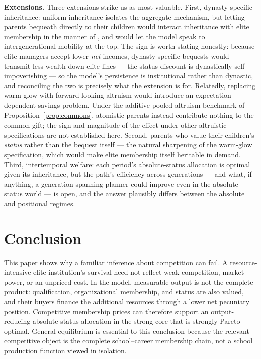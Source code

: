 \documentclass[12pt,letterpaper]{article}
\theoremstyle{definition}
\begin{document}
\textbf{Extensions.}
Three extensions strike us as most valuable.
First, dynasty-specific inheritance: uniform inheritance isolates the aggregate mechanism, but letting parents bequeath directly to their children would interact inheritance with elite membership in the manner of \citet{galorzeira1993}, and would let the model speak to intergenerational mobility at the top.
The sign is worth stating honestly: because elite managers accept lower \emph{net} incomes, dynasty-specific bequests would transmit less wealth down elite lines --- the status discount is dynastically self-impoverishing --- so the model's persistence is institutional rather than dynastic, and reconciling the two is precisely what the extension is for.
Relatedly, replacing warm glow with forward-looking altruism would introduce an expectation-dependent savings problem.
Under the additive pooled-altruism benchmark of Proposition~\ref{prop:commons}, atomistic parents instead contribute nothing to the common gift; the sign and magnitude of the effect under other altruistic specifications are not established here.
Second, parents who value their children's \emph{status} rather than the bequest itself --- the natural sharpening of the warm-glow specification, which would make elite membership itself heritable in demand.
Third, intertemporal welfare: each period's absolute-status allocation is optimal given its inheritance, but the path's efficiency across generations --- and what, if anything, a generation-spanning planner could improve even in the absolute-status world --- is open, and the answer plausibly differs between the absolute and positional regimes.

\section{Conclusion}\label{sec:conclusion}

This paper shows why a familiar inference about competition can fail.
A resource-intensive elite institution's survival need not reflect weak competition,
market power, or an unpriced cost.
In the model, measurable output is not the complete product: qualification,
organizational membership, and status are also valued, and their buyers finance the
additional resources through a lower net pecuniary position.
Competitive membership prices can therefore support an output-reducing absolute-status
allocation in the strong core that is strongly Pareto optimal.
General equilibrium is essential to this conclusion because the relevant competitive
object is the complete school--career membership chain, not a school production function
viewed in isolation.
\end{document}
